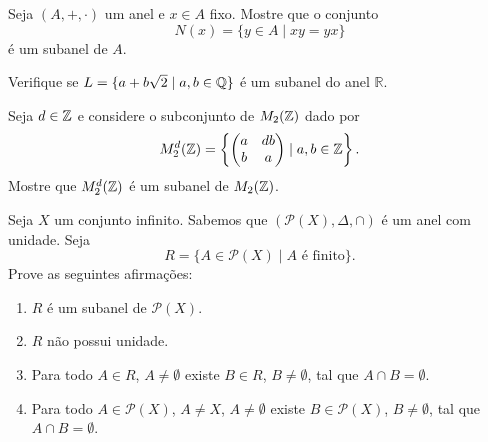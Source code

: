 \documentclass[12pt]{exam}
\begin{document}
\vspace{.3cm}

\questao{} Seja $(A, + , \cdot)$ um anel e $x \in A$ fixo. Mostre que o conjunto
\[
N(x) = \{y \in A \mid xy = yx\}
\]
é um subanel de $A$.

\newpage

\questao{} Verifique se $L = \{ a + b\sqrt{2} \mid a, b \in \mathbb{Q}\}$ é um subanel
do anel $\mathbb{R}$.

\vspace{.3cm}

\questao{} Seja $d \in \mathbb{Z}$ e considere o subconjunto de $M_2(\mathbb{Z})$ dado por
\[
M_2^d(\mathbb{Z}) = \left\{\begin{pmatrix} a & db \\ b & a \end{pmatrix} \mid a, b \in \mathbb{Z}\right\}.
\]
Mostre que $M_2^d(\mathbb{Z})$ é um subanel de $M_2(\mathbb{Z})$.

\vspace{.3cm}

\questao{} Seja $X$ um conjunto infinito. Sabemos que $(\mathcal{P}(X), \Delta, \cap)$ é um anel com unidade. Seja
\[
R = \{A \in \mathcal{P}(X) \mid A \mbox{ é finito}\}.
\]
Prove as seguintes afirmações:
\begin{enumerate}[label=({\alph*})]
    \item $R$ é um subanel de $\mathcal{P}(X)$.

    \item $R$ não possui unidade.

    \item Para todo $A \in R$, $A \ne \emptyset$ existe $B \in R$, $B \ne \emptyset$, tal que $A \cap B = \emptyset$.

    \item Para todo $A \in \mathcal{P}(X)$, $A \ne X$, $A \ne \emptyset$ existe $B \in \mathcal{P}(X)$, $B \ne \emptyset$, tal que $A \cap B = \emptyset$.
\end{enumerate}

\vspace{.6cm}
\end{document}
